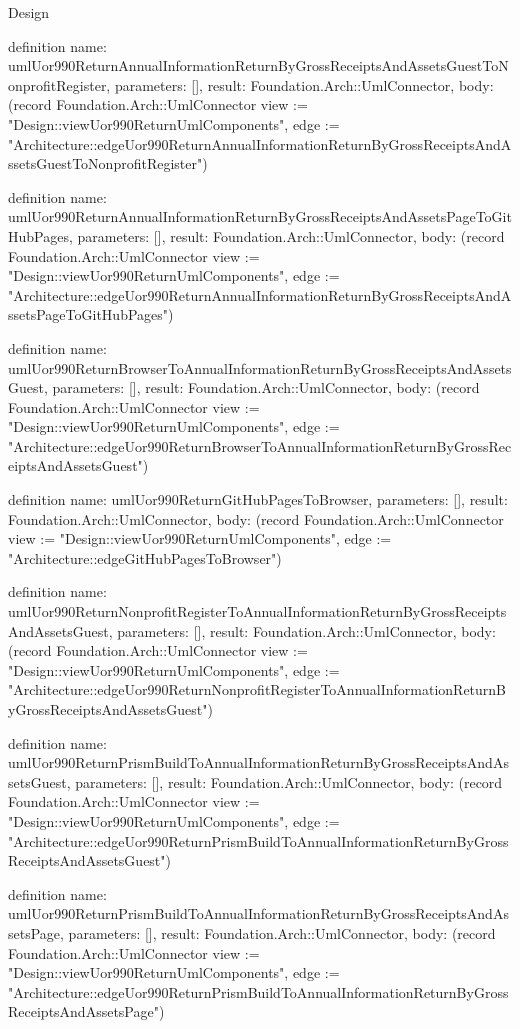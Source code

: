 \begin{lexlean}{Design}
\begin{semanticmodule}
definition{
  name: umlUor990ReturnAnnualInformationReturnByGrossReceiptsAndAssetsGuestToNonprofitRegister,
  parameters: [],
  result: Foundation.Arch::UmlConnector,
  body: (record Foundation.Arch::UmlConnector {view := "Design::viewUor990ReturnUmlComponents", edge := "Architecture::edgeUor990ReturnAnnualInformationReturnByGrossReceiptsAndAssetsGuestToNonprofitRegister"})
}

definition{
  name: umlUor990ReturnAnnualInformationReturnByGrossReceiptsAndAssetsPageToGitHubPages,
  parameters: [],
  result: Foundation.Arch::UmlConnector,
  body: (record Foundation.Arch::UmlConnector {view := "Design::viewUor990ReturnUmlComponents", edge := "Architecture::edgeUor990ReturnAnnualInformationReturnByGrossReceiptsAndAssetsPageToGitHubPages"})
}

definition{
  name: umlUor990ReturnBrowserToAnnualInformationReturnByGrossReceiptsAndAssetsGuest,
  parameters: [],
  result: Foundation.Arch::UmlConnector,
  body: (record Foundation.Arch::UmlConnector {view := "Design::viewUor990ReturnUmlComponents", edge := "Architecture::edgeUor990ReturnBrowserToAnnualInformationReturnByGrossReceiptsAndAssetsGuest"})
}

definition{
  name: umlUor990ReturnGitHubPagesToBrowser,
  parameters: [],
  result: Foundation.Arch::UmlConnector,
  body: (record Foundation.Arch::UmlConnector {view := "Design::viewUor990ReturnUmlComponents", edge := "Architecture::edgeGitHubPagesToBrowser"})
}

definition{
  name: umlUor990ReturnNonprofitRegisterToAnnualInformationReturnByGrossReceiptsAndAssetsGuest,
  parameters: [],
  result: Foundation.Arch::UmlConnector,
  body: (record Foundation.Arch::UmlConnector {view := "Design::viewUor990ReturnUmlComponents", edge := "Architecture::edgeUor990ReturnNonprofitRegisterToAnnualInformationReturnByGrossReceiptsAndAssetsGuest"})
}

definition{
  name: umlUor990ReturnPrismBuildToAnnualInformationReturnByGrossReceiptsAndAssetsGuest,
  parameters: [],
  result: Foundation.Arch::UmlConnector,
  body: (record Foundation.Arch::UmlConnector {view := "Design::viewUor990ReturnUmlComponents", edge := "Architecture::edgeUor990ReturnPrismBuildToAnnualInformationReturnByGrossReceiptsAndAssetsGuest"})
}

definition{
  name: umlUor990ReturnPrismBuildToAnnualInformationReturnByGrossReceiptsAndAssetsPage,
  parameters: [],
  result: Foundation.Arch::UmlConnector,
  body: (record Foundation.Arch::UmlConnector {view := "Design::viewUor990ReturnUmlComponents", edge := "Architecture::edgeUor990ReturnPrismBuildToAnnualInformationReturnByGrossReceiptsAndAssetsPage"})
}


\end{semanticmodule}
\end{lexlean}

